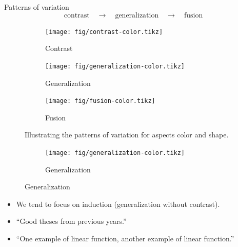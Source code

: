 \begin{frame}
  \begin{block}{Patterns of variation}
    \vspace{-0.5em}
    \[
      \text{contrast}
      \quad\rightarrow\quad
      \text{generalization}
      \quad\rightarrow\quad
      \text{fusion}
    \]
  \end{block}

  \begin{figure}
    \begin{subfigure}{0.3\columnwidth}
      \centering
      \texttt{[image: fig/contrast-color.tikz]}
      \caption{Contrast}
    \end{subfigure}
    \hfill
    \begin{subfigure}{0.3\columnwidth}
      \centering
      \texttt{[image: fig/generalization-color.tikz]}
      \caption{Generalization}
    \end{subfigure}
    \hfill
    \begin{subfigure}{0.3\columnwidth}
      \centering
      \texttt{[image: fig/fusion-color.tikz]}
      \caption{Fusion}
    \end{subfigure}
    \caption{%
      Illustrating the patterns of variation for aspects color and shape.
    }
  \end{figure}
\end{frame}

\begin{frame}
  \begin{figure}
    \hfill
    \begin{subfigure}{0.3\columnwidth}
      \centering
      \texttt{[image: fig/generalization-color.tikz]}
      \caption{Generalization}
    \end{subfigure}
    \hfill
  \end{figure}

  \begin{remark}
    \begin{itemize}
      \item We tend to focus on induction (\ie generalization without 
        contrast).
      \item \enquote{Good theses from previous years.}
      \item \enquote{One example of linear function, another example of linear 
        function.}
    \end{itemize}
  \end{remark}
\end{frame}

